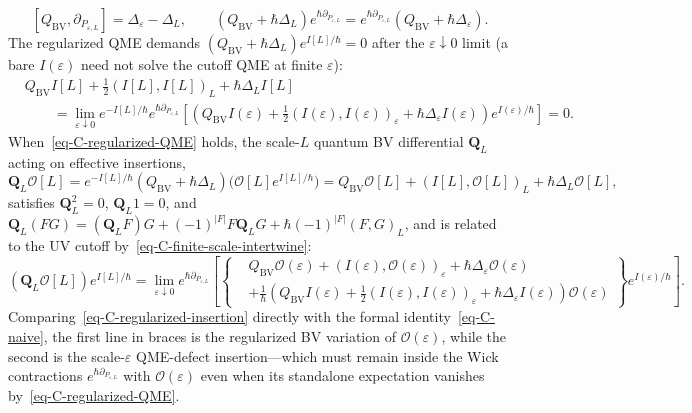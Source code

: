\documentclass[11pt]{article}
\numberwithin{equation}{section}
\numberwithin{figure}{section}
\numberwithin{table}{section}
\begin{document}
\begin{equation}\label{eq-C-finite-scale-intertwine}
[Q_{\mathrm{BV}},\partial_{P_{\varepsilon,L}}]
=\Delta_\varepsilon-\Delta_L,\qquad
(Q_{\mathrm{BV}}+\hbar\Delta_L)e^{\hbar\partial_{P_{\varepsilon,L}}}
=e^{\hbar\partial_{P_{\varepsilon,L}}}
 (Q_{\mathrm{BV}}+\hbar\Delta_\varepsilon).
\end{equation}
The regularized QME demands $(Q_{\mathrm{BV}}+\hbar\Delta_L)e^{I[L]/\hbar}=0$ after the $\varepsilon\downarrow0$ limit (a bare $I(\varepsilon)$ need not solve the cutoff QME at finite $\varepsilon$):
\begin{equation}\label{eq-C-regularized-QME}
\begin{aligned}
&Q_{\mathrm{BV}}I[L]+\frac12(I[L],I[L])_L+\hbar\Delta_LI[L]\\
&\qquad=\lim_{\varepsilon\downarrow0}e^{-I[L]/\hbar}e^{\hbar\partial_{P_{\varepsilon,L}}}
\left[\left(Q_{\mathrm{BV}}I(\varepsilon)+\frac12(I(\varepsilon),I(\varepsilon))_\varepsilon+\hbar\Delta_\varepsilon I(\varepsilon)\right)e^{I(\varepsilon)/\hbar}\right]=0.
\end{aligned}
\end{equation}
When~\eqref{eq-C-regularized-QME} holds, the scale-$L$ quantum BV differential $\mathbf Q_L$ acting on effective insertions,
\begin{equation}\label{eq-C-effective-charge}
\mathbf Q_L\mathcal O[L]
=e^{-I[L]/\hbar}(Q_{\mathrm{BV}}+\hbar\Delta_L)\bigl(\mathcal O[L]e^{I[L]/\hbar}\bigr)
=Q_{\mathrm{BV}}\mathcal O[L]+(I[L],\mathcal O[L])_L+\hbar\Delta_L\mathcal O[L],
\end{equation}
satisfies $\mathbf Q_L^2=0$, $\mathbf Q_L1=0$, and $\mathbf Q_L(FG)=(\mathbf Q_LF)G+(-1)^{|F|}F\mathbf Q_LG+\hbar(-1)^{|F|}(F,G)_L$, and is related to the UV cutoff by~\eqref{eq-C-finite-scale-intertwine}:
\begin{equation}\label{eq-C-regularized-insertion}
(\mathbf Q_L\mathcal O[L])e^{I[L]/\hbar}
=\lim_{\varepsilon\downarrow0}
 e^{\hbar\partial_{P_{\varepsilon,L}}}
 \left[\left\{\begin{aligned}
 &Q_{\mathrm{BV}}\mathcal O(\varepsilon)
 +(I(\varepsilon),\mathcal O(\varepsilon))_\varepsilon
 +\hbar\Delta_\varepsilon\mathcal O(\varepsilon)\\
 &+\frac1\hbar\left(Q_{\mathrm{BV}}I(\varepsilon)
 +\frac12(I(\varepsilon),I(\varepsilon))_\varepsilon
 +\hbar\Delta_\varepsilon I(\varepsilon)\right)\mathcal O(\varepsilon)
 \end{aligned}\right\}e^{I(\varepsilon)/\hbar}\right].
\end{equation}
Comparing~\eqref{eq-C-regularized-insertion} directly with the formal identity~\eqref{eq-C-naive}, the first line in braces is the regularized BV variation of $\mathcal O(\varepsilon)$, while the second is the scale-$\varepsilon$ QME-defect insertion---which must remain inside the Wick contractions $e^{\hbar\partial_{P_{\varepsilon,L}}}$ with $\mathcal O(\varepsilon)$ even when its standalone expectation vanishes by~\eqref{eq-C-regularized-QME}.
\end{document}
